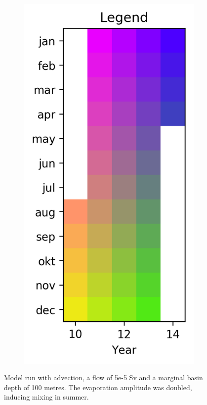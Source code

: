 \documentclass[twocolumn]{article}
\begin{document}
\begin{figure}
\begin{subfigure}[h]{0.20\textwidth}
\includegraphics[width=1.0\textwidth,keepaspectratio]{summer_mixing_Legend.png}
\end{subfigure}\hfill
\caption{Model run with advection, a flow of 5e-5 Sv and a marginal basin depth of 100 metres. The evaporation amplitude was doubled, inducing mixing in summer.}
\label{fig:summer_mixing}
\end{figure}
\end{document}
